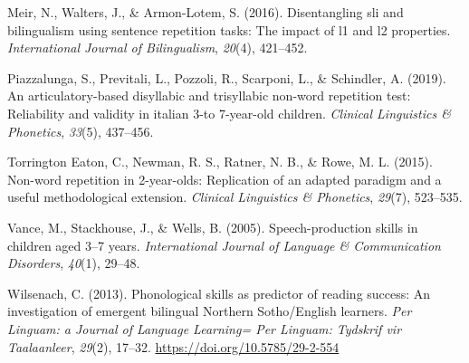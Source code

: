 \documentclass[english,,man,floatsintext]{apa6}
\begin{document}
\leavevmode\hypertarget{ref-meir2016disentangling}{}%
Meir, N., Walters, J., \& Armon-Lotem, S. (2016). Disentangling sli and bilingualism using sentence repetition tasks: The impact of l1 and l2 properties. \emph{International Journal of Bilingualism}, \emph{20}(4), 421--452.

\leavevmode\hypertarget{ref-piazzalunga2019articulatory}{}%
Piazzalunga, S., Previtali, L., Pozzoli, R., Scarponi, L., \& Schindler, A. (2019). An articulatory-based disyllabic and trisyllabic non-word repetition test: Reliability and validity in italian 3-to 7-year-old children. \emph{Clinical Linguistics \& Phonetics}, \emph{33}(5), 437--456.

\leavevmode\hypertarget{ref-torrington2015non}{}%
Torrington Eaton, C., Newman, R. S., Ratner, N. B., \& Rowe, M. L. (2015). Non-word repetition in 2-year-olds: Replication of an adapted paradigm and a useful methodological extension. \emph{Clinical Linguistics \& Phonetics}, \emph{29}(7), 523--535.

\leavevmode\hypertarget{ref-vance2005speech}{}%
Vance, M., Stackhouse, J., \& Wells, B. (2005). Speech-production skills in children aged 3--7 years. \emph{International Journal of Language \& Communication Disorders}, \emph{40}(1), 29--48.

\leavevmode\hypertarget{ref-wilsenach2013phonological}{}%
Wilsenach, C. (2013). Phonological skills as predictor of reading success: An investigation of emergent bilingual Northern Sotho/English learners. \emph{Per Linguam: a Journal of Language Learning= Per Linguam: Tydskrif vir Taalaanleer}, \emph{29}(2), 17--32. \url{https://doi.org/10.5785/29-2-554}
\end{document}
